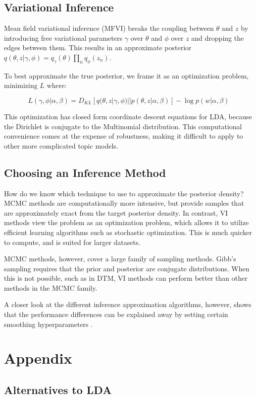 \documentclass[letterpaper]{article}
\begin{document}
\subsection{Variational Inference}
\label{subsec:vi}
Mean field variational inference (MFVI) breaks the coupling between
$\theta$ and $z$ by introducing free variational parameters $\gamma$
over $\theta$ and $\phi$ over $z$ and dropping the edges between them.
This results in an approximate posterior $q(\theta, z | \gamma, \phi)
= q_\gamma(\theta)\prod_nq_\phi(z_n)$.

To best approximate the true posterior, we frame it as an optimization
problem, minimizing $L$ where:

\begin{equation}
L(\gamma, \phi | \alpha, \beta) = D_{KL}\left[ q(\theta, z | \gamma,
  \phi) || p(\theta, z | \alpha, \beta) \right] - \log p(w | \alpha, \beta)
\end{equation}

This optimization has closed form coordinate descent equations for
LDA, because the Dirichlet is conjugate to the Multinomial
distribution. This computational convenience comes at the expense of
robustness, making it difficult to apply to other more complicated
topic models.

\subsection{Choosing an Inference Method}
\label{sub:choosing-inference}
How do we know which technique to use to approximate the posterior
density? MCMC methods are computationally more intensive, but provide
samples that are approximately exact from the target posterior
density. In contrast, VI methods view the problem as an optimization
problem, which allows it to utilize efficient learning algorithms such
as stochastic optimization. This is much quicker to compute, and is
suited for larger datasets.

MCMC methods, however, cover a large family of sampling methods.
Gibb's sampling requires that the prior and posterior are conjugate
distributions. When this is not possible, such as in DTM, VI methods
can perform better than other methods in the MCMC family.

A closer look at the different inference approximation algorithms,
however, shows that the performance differences can be explained away
by setting certain smoothing hyperparameters
\citep{asuncion-2012-smoot-infer}.

\section{Appendix}

\subsection{Alternatives to LDA}


\end{document}
